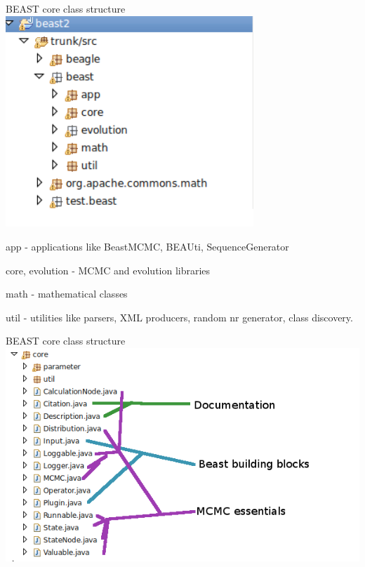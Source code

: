 \documentclass{beamer}
\theoremstyle{definition}
\begin{document}
\begin{frame}{BEAST core class structure}
\includegraphics[width=0.7\textwidth]{classes2.png}

app - applications like BeastMCMC, BEAUti, SequenceGenerator

core, evolution - MCMC and evolution libraries

math - mathematical classes

util - utilities like parsers, XML producers, random nr generator, class discovery.

\end{frame}

\begin{frame}{BEAST core class structure}
\includegraphics[width=\textwidth]{classes3.png}
\end{frame}
\end{document}
